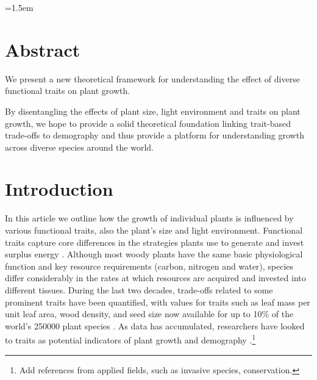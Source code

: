 \documentclass[a4paper,11pt]{article}
\date{}
\begin{document}
\mstitlepage
\noindent
\parindent=1.5em
\addtolength{\parskip}{.3em}


\section{Abstract}
We present a new theoretical framework for understanding the effect of diverse functional traits on plant growth.


By disentangling the effects of plant size, light environment and traits on plant growth, we hope to provide a solid theoretical foundation linking trait-based trade-offs to demography and thus provide a platform for understanding growth across diverse species around the world.

\section{Introduction}

In this article we outline how the growth of individual plants is influenced by various functional traits, also the plant's size and light environment. Functional traits capture core differences in the strategies plants use to generate and invest surplus energy \citep{Westoby-2002, Wright-2004, Chave-2009}. Although most woody plants have the same basic physiological function and key resource requirements (carbon, nitrogen and water), species differ considerably in the rates at which resources are acquired and invested into different tissues. During the last two decades, trade-offs related to some prominent traits have been quantified, with values for traits such as leaf mass per unit leaf area, wood density, and seed size now available for up to 10\% of the world's 250000 plant species \citep{Cornwell-2014}. As data has accumulated, researchers have looked to traits as potential indicators of plant growth and demography \citep{Poorter-2008, Wright-2010, Adler-2014}.\footnote{Add references from applied fields, such as invasive species, conservation.}
\end{document}
